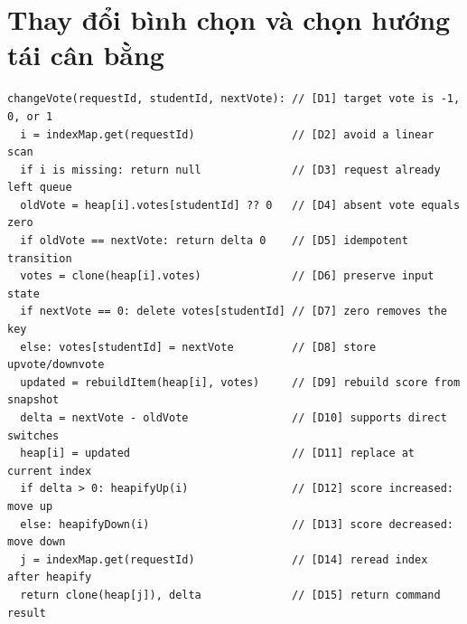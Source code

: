 \documentclass[12pt,a4paper,twoside,openright]{report}
\begin{document}
\section{Thay đổi bình chọn và chọn hướng tái cân bằng}
\begin{lstlisting}[style=algorithm]
changeVote(requestId, studentId, nextVote): // [D1] target vote is -1, 0, or 1
  i = indexMap.get(requestId)               // [D2] avoid a linear scan
  if i is missing: return null              // [D3] request already left queue
  oldVote = heap[i].votes[studentId] ?? 0   // [D4] absent vote equals zero
  if oldVote == nextVote: return delta 0    // [D5] idempotent transition
  votes = clone(heap[i].votes)              // [D6] preserve input state
  if nextVote == 0: delete votes[studentId] // [D7] zero removes the key
  else: votes[studentId] = nextVote         // [D8] store upvote/downvote
  updated = rebuildItem(heap[i], votes)     // [D9] rebuild score from snapshot
  delta = nextVote - oldVote                // [D10] supports direct switches
  heap[i] = updated                         // [D11] replace at current index
  if delta > 0: heapifyUp(i)                // [D12] score increased: move up
  else: heapifyDown(i)                      // [D13] score decreased: move down
  j = indexMap.get(requestId)               // [D14] reread index after heapify
  return clone(heap[j]), delta              // [D15] return command result
\end{lstlisting}
\end{document}
